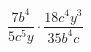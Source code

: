 \begin{ex}
	\begin{condition}
		\( \dfrac{7b^4}{5c^5y}\cdot\dfrac{18c^4y^3}{35b^4c} \)
	\end{condition}
\end{ex}